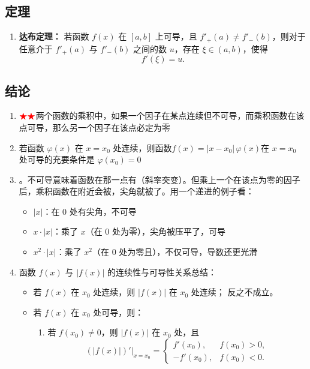 \documentclass[../book.tex]{subfiles}
\begin{document}
    \subsection{定理}

    \begin{enumerate}
        \item \textbf{达布定理：} 若函数 $f(x)$ 在 $[a,b]$ 上可导，且 $f'_+(a)\neq f'_-(b)$，则对于任意介于 $f'_+(a)$ 与 $f'_-(b)$ 之间的数 $u$，存在 $\xi\in(a,b)$，使得
        \[
            f'(\xi)=u.
        \]
    \end{enumerate}

    \subsection{结论}

    \begin{enumerate}
        \item $\color{red}{\bigstar}\color{red}{\bigstar}$两个函数的乘积中，如果一个因子在某点连续但不可导，而乘积函数在该点可导，那么另一个因子在该点必定为零
        \item 若函数 $\varphi(x)$ 在 $x=x_0$ 处连续，则函数$f(x)=|x-x_0|\,\varphi(x)$在 $x=x_0$ 处可导的充要条件是 $\varphi(x_0)=0$
        \item {}。不可导意味着函数在那一点有{}（斜率突变）。但乘上一个在该点为零的因子后，乘积函数在附近会被{}，尖角就被{}了。用一个递进的例子看：
        \begin{itemize}
            \item $|x|$：在 $0$ 处有尖角，不可导
            \item $x \cdot |x|$：乘了 $x$（在 $0$ 处为零），尖角被压平了，可导
            \item $x^2 \cdot |x|$：乘了 $x^2$（在 $0$ 处为零且{}），不仅可导，导数还更光滑
        \end{itemize}
        \item 函数 $f(x)$ 与 $|f(x)|$ 的连续性与可导性关系总结：
        \begin{itemize}
            \item 若 $f(x)$ 在 $x_0$ 处连续，则 $|f(x)|$ 在 $x_0$ 处连续； 反之不成立。
            \item 若 $f(x)$ 在 $x_0$ 处可导，则：
            \begin{enumerate}[label=(\alph*)]
                \item 若 $f(x_0) \neq 0$，则 $|f(x)|$ 在 $x_0$ 处{\color{red}{可导}}，且
                \[
                    \left.(|f(x)|)'\right|_{x=x_0}
                    =
                    \begin{cases}
                        f'(x_0), & f(x_0) > 0, \\[0.3em]
                        -f'(x_0), & f(x_0) < 0.
                    \end{cases}
                \]


\end{enumerate}
\end{itemize}
\end{enumerate}
\end{document}
